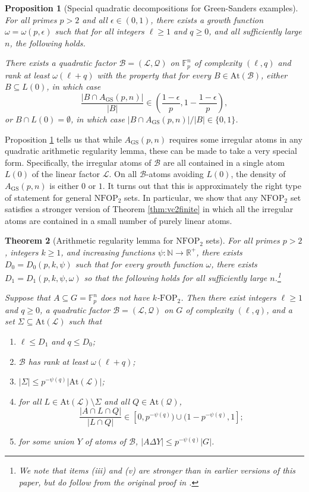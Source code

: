 \documentclass[12pt,oneside,british,a4wide]{amsart}
\newtheorem{theorem}{Theorem}[section]
\newtheorem{proposition}[theorem]{Proposition}
\numberwithin{equation}{section}
\theoremstyle{definition}
\def\F{\mathbb{F}}
\def\FOP{\mathrm{FOP}}
\def\NFOP{\mathrm{NFOP}}
\def\GS{\mathrm{GS}}
\def\e{\epsilon}
\newcommand{\calL}{\mathcal{L}}
\newcommand{\calB}{\mathcal{B}}
\newcommand{\calQ}{\mathcal{Q}}
\newcommand{\At}{{\mathrm{At}}}
\begin{document}
\begin{proposition}[Special quadratic decompositions for Green-Sanders examples]\label{prop:gslinear1}
For all primes $p>2$ and all $\e\in (0,1)$, there exists a growth function $\omega=\omega(p,\e)$ such that for all integers $\ell\geq 1$ and $q\geq 0$, and all sufficiently large $n$, the following holds. 

There exists a quadratic factor $\calB=(\calL, \calQ)$ on $\mathbb{F}_p^n$ of complexity $(\ell,q)$ and rank at least $\omega(\ell+q)$ with the property that for every $B\in \At(\calB)$, either $B\subseteq L(0)$, in which case 
\[\frac{|B\cap A_{\GS}(p,n)|}{|B|}\in \left(\frac{1-\e}{p},1-\frac{1-\e}{p}\right),\] 
or $B\cap L(0)=\emptyset$, in which case $|B\cap A_{\GS}(p,n)|/|B|\in \{0,1\}$.  
\end{proposition}

 

Proposition \ref{prop:gslinear1} tells us that while $A_{\GS}(p,n)$ requires some  irregular atoms in any quadratic arithmetic regularity lemma, these can be made to take a  very special form. Specifically, the irregular atoms of $\calB$ are all contained in a single atom $L(0)$ of the linear factor $\calL$. On all $\calB$-atoms avoiding $L(0)$, the density of $A_{\GS}(p,n)$ is either $0$ or $1$.  It turns out that this is approximately the right type of statement for general $\NFOP_2$ sets.  In particular, we show that any $\NFOP_2$ set satisfies a stronger version of Theorem \ref{thm:vc2finite} in which all the irregular atoms are contained in a small number of purely linear atoms.

\begin{theorem}[Arithmetic regularity lemma for $\NFOP_2$ sets]\label{thm:fop}
For all primes $p>2$, integers $k\geq 1$, and increasing functions $\psi:\mathbb{N}\rightarrow \mathbb{R}^+$, there exists $D_0=D_0(p, k,\psi)$ such that for every growth function $\omega$, there exists $D_1=D_1(p, k,\psi,\omega)$ so that the following holds for all sufficiently large $n$.\footnote{We note that items (iii) and (v) are stronger than in earlier versions of this paper,  but do follow from the original proof in \cite{Terry.2021av2}.}

Suppose that $A\subseteq G=\F_p^n$ does not have $k$-$\FOP_2$. Then there exist integers $\ell\geq 1$ and $q\geq 0$,   a quadratic factor $\calB=(\calL,\calQ)$ on $G$ of complexity $(\ell,q)$, and a set $\Sigma\subseteq \At(\calL)$ such that 
\begin{enumerate}[label=\normalfont(\roman*)] 
\item $\ell\leq D_1$ and $q\leq D_0$;
\item $\calB$ has rank at least $\omega(\ell+q)$; 
\item $|\Sigma|\leq p^{-\psi(q)}|\At(\calL)|$;
\item for all $L\in \At(\calL)\setminus \Sigma$ and all $Q\in \At(\calQ)$, 
\[\frac{|A\cap L\cap Q|}{|L\cap Q|}\in [0,p^{-\psi(q)})\cup (1-p^{-\psi(q)},1];\] 
\item for some union $Y$ of atoms of $\calB$, $|A\Delta Y |\leq p^{-\psi(q)}|G|$.
\end{enumerate}
\end{theorem}
\end{document}

